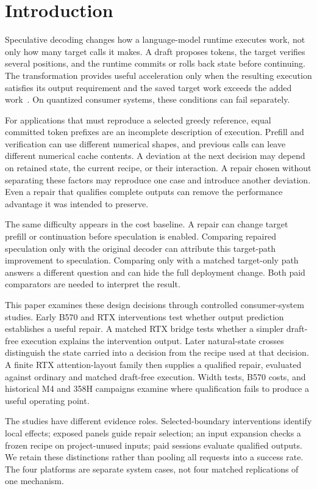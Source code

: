 \section{Introduction}
Speculative decoding changes how a language-model runtime executes work, not only how many target calls it makes. A draft proposes tokens, the target verifies several positions, and the runtime commits or rolls back state before continuing. The transformation provides useful acceleration only when the resulting execution satisfies its output requirement and the saved target work exceeds the added work~\cite{leviathan2023}. On quantized consumer systems, these conditions can fail separately.

For applications that must reproduce a selected greedy reference, equal committed token prefixes are an incomplete description of execution. Prefill and verification can use different numerical shapes, and previous calls can leave different numerical cache contents. A deviation at the next decision may depend on retained state, the current recipe, or their interaction. A repair chosen without separating these factors may reproduce one case and introduce another deviation. Even a repair that qualifies complete outputs can remove the performance advantage it was intended to preserve.

The same difficulty appears in the cost baseline. A repair can change target prefill or continuation before speculation is enabled. Comparing repaired speculation only with the original decoder can attribute this target-path improvement to speculation. Comparing only with a matched target-only path answers a different question and can hide the full deployment change. Both paid comparators are needed to interpret the result.

This paper examines these design decisions through controlled consumer-system studies. Early B570 and RTX interventions test whether output prediction establishes a useful repair. A matched RTX bridge tests whether a simpler draft-free execution explains the intervention output. Later natural-state crosses distinguish the state carried into a decision from the recipe used at that decision. A finite RTX attention-layout family then supplies a qualified repair, evaluated against ordinary and matched draft-free execution. Width tests, B570 costs, and historical M4 and 358H campaigns examine where qualification fails to produce a useful operating point.

The studies have different evidence roles. Selected-boundary interventions identify local effects; exposed panels guide repair selection; an input expansion checks a frozen recipe on project-unused inputs; paid sessions evaluate qualified outputs. We retain these distinctions rather than pooling all requests into a success rate. The four platforms are separate system cases, not four matched replications of one mechanism.

